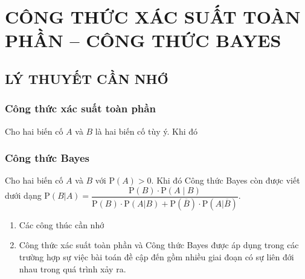 \section{CÔNG THỨC XÁC SUẤT TOÀN PHẦN -- CÔNG THỨC BAYES}
\subsection{LÝ THUYẾT CẦN NHỚ}
\subsubsection{Công thức xác suất toàn phần}
	Cho hai biến cố $A$ và $B$ là hai biến cố tùy ý. Khi đó
\subsubsection{Công thức Bayes}
	Cho hai biến cố $A$ và $B$ với $\mathrm{P}(A)>0$. Khi đó
	Công thức Bayes còn được viết dưới dạng $\mathrm{P}(B | A)=\dfrac{\mathrm{P}(B) \cdot \mathrm{P}(A \mid B)}{\mathrm{P}(B)\cdot \mathrm{P}(A | B)+\mathrm{P}\left(\overline{B}\right)\cdot  \mathrm{P}\left(A | \overline{B}\right)}$.
\begin{note}
	\begin{enumerate}[\iconCH]
		\item {} Các công thúc cần nhớ
		\item {} Công thức xác suất toàn phần và Công thức Bayes được áp dụng trong các trường hợp sự việc bài toán đề cập đến gồm nhiều giai đoạn có sự liên đới nhau trong quá trình xảy ra.
	\end{enumerate}
\end{note}
